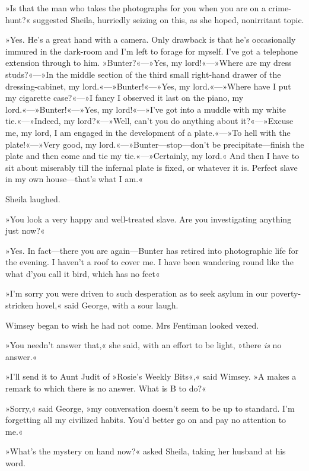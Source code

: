 »Is that the man who takes the photographs for you when you are on a crime-hunt?« suggested Sheila, hurriedly seizing on this, as she hoped, nonirritant topic.

»Yes. He's a great hand with a camera. Only drawback is that he's occasionally immured in the dark-room and I'm left to forage for myself. I've got a telephone extension through to him. »Bunter?«---»Yes, my lord!«---»Where are my dress studs?«---»In the middle section of the third small right-hand drawer of the dressing-cabinet, my lord.«---»Bunter!«---»Yes, my lord.«---»Where have I put my cigarette case?«---»I fancy I observed it last on the piano, my lord.«---»Bunter!«---»Yes, my lord!«---»I've got into a muddle with my white tie.«---»Indeed, my lord?«---»Well, can't you do anything about it?«---»Excuse me, my lord, I am engaged in the development of a plate.«---»To hell with the plate!«---»Very good, my lord.«---»Bunter\allowbreak---\allowbreak stop---don't be precipitate\allowbreak---\allowbreak finish the plate and then come and tie my tie.«---»Certainly, my lord.« And then I have to sit about miserably till the infernal plate is fixed, or whatever it is. Perfect slave in my own house\allowbreak---\allowbreak that's what I am.«

Sheila laughed.

»You look a very happy and well-treated slave. Are you investigating anything just now?«

»Yes. In fact\allowbreak---\allowbreak there you are again\allowbreak---\allowbreak Bunter has retired into photographic life for the evening. I haven't a roof to cover me. I have been wandering round like the what d'you call it bird, which has no feet\longdash«

»I'm sorry you were driven to such desperation as to seek asylum in our poverty-stricken hovel,« said George, with a sour laugh.

Wimsey began to wish he had not come. Mrs Fentiman looked vexed.

»You needn't answer that,« she said, with an effort to be light, »there \textit{is} no answer.«

»I'll send it to Aunt Judit of »Rosie's Weekly Bits«,« said Wimsey. »A makes a remark to which there is no answer. What is B to do?«

»Sorry,« said George, »my conversation doesn't seem to be up to standard. I'm forgetting all my civilized habits. You'd better go on and pay no attention to me.«

»What's the mystery on hand now?« asked Sheila, taking her husband at his word.

